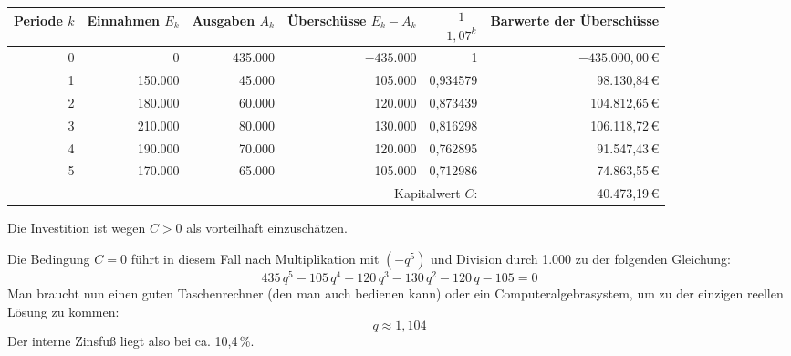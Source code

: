 \begin{center}
  \begin{tabular}{rrrrrr}
    \hline
    Periode $k$ & Einnahmen $E_k$ & Ausgaben $A_k$ & Überschüsse $E_k - A_k$ & $\dfrac{1}{1{,}07^k}$ & Barwerte der Überschüsse\\
    \hline
    0 & 0 & 435.000 & $-435.000$ & 1 & $-435.000{,}00$\,€\\
    1 & 150.000 & 45.000 & 105.000 & 0{,}934579 & 98.130{,}84\,€\\
    2 & 180.000 & 60.000 & 120.000 & 0{,}873439 & 104.812{,}65\,€\\
    3 & 210.000 & 80.000 & 130.000 & 0{,}816298 & 106.118{,}72\,€\\
    4 & 190.000 & 70.000 & 120.000 & 0{,}762895 & 91.547{,}43\,€\\
    5 & 170.000 & 65.000 & 105.000 & 0{,}712986 & 74.863{,}55\,€\\
    \hline
    \multicolumn{5}{r}{Kapitalwert $C$:} & 40.473{,}19\,€\\
    \hline
  \end{tabular}
\end{center}
Die Investition ist wegen $C > 0$ als vorteilhaft einzuschätzen.

Die Bedingung $C = 0$ führt in diesem Fall nach Multiplikation mit $(-q^5)$ und Division durch 1.000 zu der folgenden Gleichung:
\[ 435\,q^5 - 105\,q^4 - 120\,q^3 - 130\,q^2 - 120\,q - 105 = 0 \]
Man braucht nun einen guten Taschenrechner (den man auch bedienen kann) oder ein Computeralgebrasystem, um zu der einzigen reellen Lösung zu kommen:
\[ q \approx 1{,}104 \]
Der interne Zinsfuß liegt also bei ca. 10{,}4\,\%.
